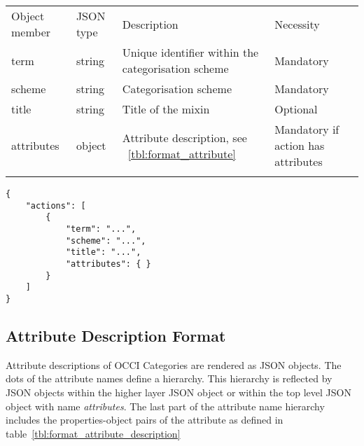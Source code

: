 \documentclass[10pt,a4paper]{article}
\begin{document}
 {
    \begin{tabular}{llll}
    \toprule
    Object member & JSON type & Description & Necessity\\
    \colrule
    term & string & Unique identifier within the categorisation scheme & Mandatory\\
    scheme & string & Categorisation scheme & Mandatory\\
    title & string & Title of the mixin & Optional\\
    attributes & object & Attribute description, see ~\ref{tbl:format_attribute} & Mandatory if action has attributes\\
    \botrule
    \end{tabular}
}

\begin{verbatim}
{
    "actions": [
        {
            "term": "...",
            "scheme": "...",
            "title": "...",
            "attributes": { }
        }
	]
}
\end{verbatim}

\subsection{Attribute Description Format}
\label{sec:format_attribute_description}

Attribute descriptions of OCCI Categories are rendered as JSON objects. 
The dots of the attribute names define a hierarchy. This hierarchy is reflected 
by JSON objects within the higher layer JSON object or within the top level 
JSON object with name {\em attributes}. The last part of the attribute name
 hierarchy includes the properties-object pairs of the attribute as defined 
 in table~\ref{tbl:format_attribute_description}
\end{document}

